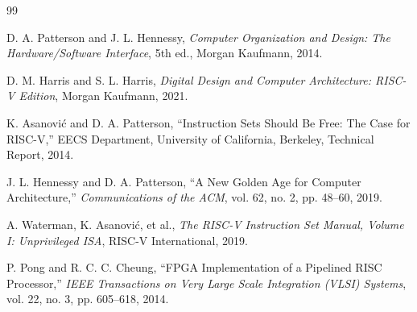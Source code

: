 \documentclass[12pt,a4paper]{report}
\begin{document}
\clearpage

\renewcommand{\bibname}{References}

\begin{thebibliography}{99}

D. A. Patterson and J. L. Hennessy,
\textit{Computer Organization and Design: The Hardware/Software Interface},
5th ed., Morgan Kaufmann, 2014.

D. M. Harris and S. L. Harris,
\textit{Digital Design and Computer Architecture: RISC-V Edition},
Morgan Kaufmann, 2021.

K. Asanovi\'c and D. A. Patterson,
``Instruction Sets Should Be Free: The Case for RISC-V,''
EECS Department, University of California, Berkeley, Technical Report, 2014.

J. L. Hennessy and D. A. Patterson,
``A New Golden Age for Computer Architecture,''
\textit{Communications of the ACM},
vol. 62, no. 2, pp. 48--60, 2019.

A. Waterman, K. Asanovi\'c, et al.,
\textit{The RISC-V Instruction Set Manual, Volume I: Unprivileged ISA},
RISC-V International, 2019.

P. Pong and R. C. C. Cheung,
``FPGA Implementation of a Pipelined RISC Processor,''
\textit{IEEE Transactions on Very Large Scale Integration (VLSI) Systems},
vol. 22, no. 3, pp. 605--618, 2014.

\end{thebibliography}
\end{document}
